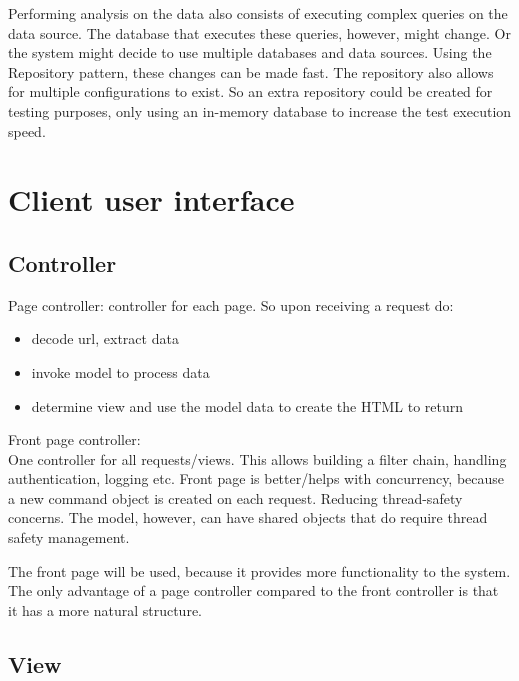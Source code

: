 Performing analysis on the data also consists of executing complex queries on the data source. The database that executes these queries, however, might change. Or the system might decide to use multiple databases and data sources.
Using the Repository pattern, these changes can be made fast. The repository also allows for multiple configurations to exist. So an extra repository could be created for testing purposes, only using an in-memory database to increase the test execution speed.

\section{Client user interface}

\subsection{Controller}
Page controller: controller for each page. So upon receiving a request do:
\begin{itemize}
\item decode url, extract data
\item invoke model to process data
\item determine view and use the model data to create the HTML to return
\end{itemize}

Front page controller:\\
One controller for all requests/views. This allows building a filter chain, handling authentication, logging etc.
Front page is better/helps with concurrency, because a new command object is created on each request. Reducing thread-safety concerns. The model, however, can have shared objects that do require thread safety management.

The front page will be used, because it provides more functionality to the system. The only advantage of a page controller compared to the front controller is that it has a more natural structure.

\subsection{View}

